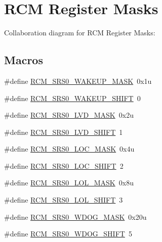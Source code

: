 \hypertarget{group___r_c_m___register___masks}{}\section{R\+CM Register Masks}
\label{group___r_c_m___register___masks}
Collaboration diagram for R\+CM Register Masks\+:
\subsection*{Macros}
\begin{DoxyCompactItemize}
\item 
\#define \hyperlink{group___r_c_m___register___masks_gacdeb6976064d599d6cd063b26a25dbda}{R\+C\+M\+\_\+\+S\+R\+S0\+\_\+\+W\+A\+K\+E\+U\+P\+\_\+\+M\+A\+SK}~0x1u
\item 
\#define \hyperlink{group___r_c_m___register___masks_ga2e140fc50106a6145cffe4b72671bbc2}{R\+C\+M\+\_\+\+S\+R\+S0\+\_\+\+W\+A\+K\+E\+U\+P\+\_\+\+S\+H\+I\+FT}~0
\item 
\#define \hyperlink{group___r_c_m___register___masks_ga4de74187b3bcc5b40a526b3ab5afda88}{R\+C\+M\+\_\+\+S\+R\+S0\+\_\+\+L\+V\+D\+\_\+\+M\+A\+SK}~0x2u
\item 
\#define \hyperlink{group___r_c_m___register___masks_gad3f4cb02d84182ddd0933dc93e1ec4ba}{R\+C\+M\+\_\+\+S\+R\+S0\+\_\+\+L\+V\+D\+\_\+\+S\+H\+I\+FT}~1
\item 
\#define \hyperlink{group___r_c_m___register___masks_ga0983314adae781518e2481ae518e14d8}{R\+C\+M\+\_\+\+S\+R\+S0\+\_\+\+L\+O\+C\+\_\+\+M\+A\+SK}~0x4u
\item 
\#define \hyperlink{group___r_c_m___register___masks_ga87c1e113b052d6c10c450973efa74eb7}{R\+C\+M\+\_\+\+S\+R\+S0\+\_\+\+L\+O\+C\+\_\+\+S\+H\+I\+FT}~2
\item 
\#define \hyperlink{group___r_c_m___register___masks_ga0db6908ad880d9f7fd190fbb6922adda}{R\+C\+M\+\_\+\+S\+R\+S0\+\_\+\+L\+O\+L\+\_\+\+M\+A\+SK}~0x8u
\item 
\#define \hyperlink{group___r_c_m___register___masks_ga95ccd3811dd00bd56b397939db9b248d}{R\+C\+M\+\_\+\+S\+R\+S0\+\_\+\+L\+O\+L\+\_\+\+S\+H\+I\+FT}~3
\item 
\#define \hyperlink{group___r_c_m___register___masks_gad203634bcb298bf54a3d5cce5c378a7e}{R\+C\+M\+\_\+\+S\+R\+S0\+\_\+\+W\+D\+O\+G\+\_\+\+M\+A\+SK}~0x20u
\item 
\#define \hyperlink{group___r_c_m___register___masks_gac989a90d61cdfb7e612c212a3f6d06d8}{R\+C\+M\+\_\+\+S\+R\+S0\+\_\+\+W\+D\+O\+G\+\_\+\+S\+H\+I\+FT}~5

\end{DoxyCompactItemize}
